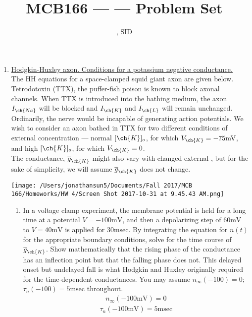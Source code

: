\documentclass[11pt]{article}
\title{MCB166 --- \Session --- Problem Set \Homework}
\author{\Name, SID \SID}
\date{\displaydate{date}}
\begin{document}
\maketitle

\newpage
\begin{enumerate}[label=\arabic*.]
\item
\underline{Hodgkin-Huxley axon. Conditions for a potassium negative conductance.}
\\
The HH equations for a space-clamped squid giant axon are given below. Tetrodotoxin (TTX), the puffer-fish poison is known to block axonal  channels. When TTX is introduced into the bathing medium, the axon $I_{\ch{Na}}$ will be blocked and $I_{\ch{K}}$ and $I_{\ch{L}}$ will remain unchanged. Ordinarily, the nerve would be incapable of generating action potentials. We wish to consider an axon bathed in TTX for two different conditions of external  concentration --- normal $[\ch{K}]_o$, for which $V_{\ch{K}} = -75 \text{mV}$, and high $[\ch{K}]_o$, for which $V_{\ch{K}} = 0$.
\\
The conductance, $\overline{g}_{\ch{K}}$ might also vary with changed external , but for the sake of simplicity, we will assume $\overline{g}_{\ch{K}}$ does not change.
\begin{center}
\texttt{[image: /Users/jonathansun5/Documents/Fall 2017/MCB 166/Homeworks/HW 4/Screen Shot 2017-10-31 at 9.45.43 AM.png]}
\end{center}
\begin{enumerate}[label=(\alph*)]
\item
In a voltage clamp experiment, the membrane potential is held for a long time at a potential $V = -100 \text{mV}$, and then a depolarizing step of $60 \text{mV}$ to $V = 40 \text{mV}$ is applied for $30 \text{msec}$. By integrating the equation for $n(t)$ for the appropriate boundary conditions, solve for the time course of $\overline{g}_{\ch{K}}$. Show mathematically that the rising phase of the conductance has an inflection point but that the falling phase does not. This delayed onset but undelayed fall is what Hodgkin and Huxley originally required for the time-dependent conductances. You may assume $n_{\infty}(-100) = 0$; $\tau_n(-100) = 5 \text{msec}$ throughout.
\begin{align*}
n_{\infty}(-100 \text{mV}) = 0
\end{align*}
\begin{align*}
\tau_{n}(-100 \text{mV}) = 5 \text{msec}
\end{align*}

\end{enumerate}
\end{enumerate}
\end{document}
